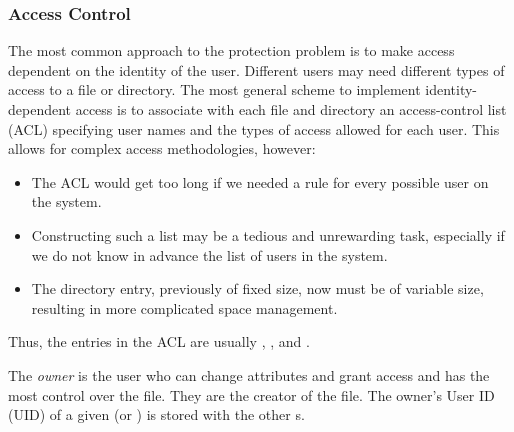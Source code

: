 \subsubsection{Access Control}\label{subsubsec:Access_Control}
The most common approach to the protection problem is to make access dependent on the identity of the user.
Different users may need different types of access to a file or directory.
The most general scheme to implement identity-dependent access is to associate with each file and directory an access-control list (ACL) specifying user names and the types of access allowed for each user.
This allows for complex access methodologies, however:
\begin{itemize}[noitemsep]
\item The ACL would get too long if we needed a rule for every possible user on the system.
\item Constructing such a list may be a tedious and unrewarding task, especially if we do not know in advance the list of users in the system.
\item The directory entry, previously of fixed size, now must be of variable size, resulting in more complicated space management.
\end{itemize}

Thus, the entries in the ACL are usually , , and .
\begin{definition}[Owner]\label{def:File_Owner}
  The \emph{owner} is the user who can change attributes and grant access and has the most control over the file.
  They are the creator of the file.
  The owner's User ID (UID) of a given  (or ) is stored with the other s.
\end{definition}


